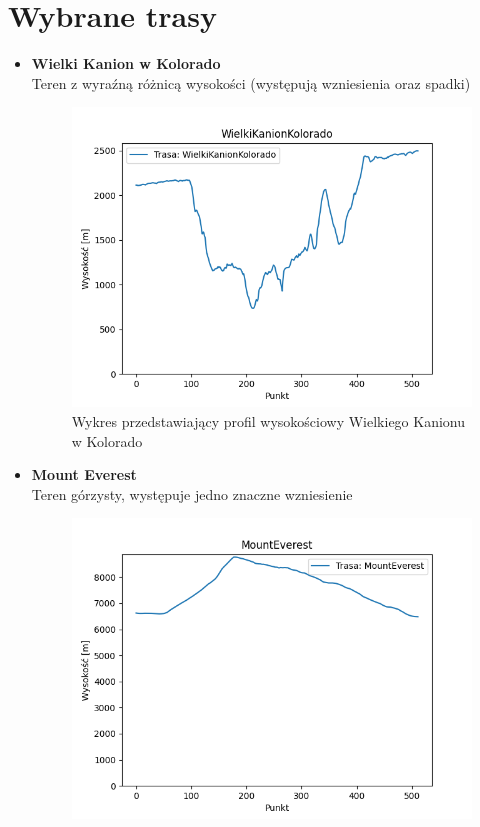 \documentclass[12pt]{extarticle}
\begin{document}
\section*{Wybrane trasy}
\begin{itemize}
    \item \textbf{Wielki Kanion w Kolorado}\\
    Teren z wyraźną różnicą wysokości (występują wzniesienia oraz spadki)
    \begin{figure}[H]
        \centering
        \includegraphics[scale=0.8]{WielkiKanionKolorado.png}
        \caption{Wykres przedstawiający profil wysokościowy Wielkiego Kanionu w Kolorado}
    \end{figure}
    \item \textbf{Mount Everest}\\
    Teren górzysty, występuje jedno znaczne wzniesienie
    \begin{figure}[H]
        \centering
        \includegraphics[scale=0.8]{MountEverest.png}

\end{figure}
\end{itemize}
\end{document}
